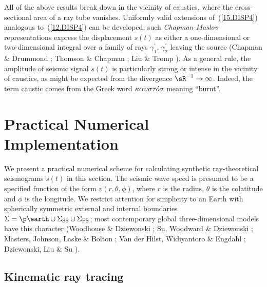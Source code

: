 All of the above results break down in the vicinity of caustics,
where the cross-sectional area of a ray tube vanishes.  Uniformly
valid extensions of~(\ref{15.DISP4}) analogous to~(\ref{12.DISP4})
can be developed; such {\em Chapman-Maslov\/}
%
representations express
the displacement $s(t)$ as either a one-dimensional or two-dimensional
integral over a family of rays $\gamma^{\prime}_1$, $\gamma^{\prime}_2$
leaving the source (Chapman \& Drummond \citeyear{chapman&drummond82};
Thomson \& Chapman \citeyear{thomson&chapman85};
Liu \& Tromp \citeyear{liu&tromp96}).   As a general rule,
the amplitude of seismic signal $s(t)$ is particularly strong or intense
in the vicinity of caustics, as might be expected from the
divergence $\sR^{-1}\rightarrow\infty$.  Indeed, the term caustic
comes from the Greek word $\kappa\alpha\upsilon\sigma
\tau\hspace{-0.2 mm}\acute{o}\sigma$ meaning ``burnt''.
%
%
%
%

\section{Practical Numerical Implementation}
\label{section:15.8}

We present a practical numerical scheme for calculating
synthetic ray-theoretical seismograms $s(t)$ in this section.
The seismic wave speed is presumed to be a specified function of
the form $v(r,\theta,\phi)$, where
$r$ is the radius, $\theta$ is the colatitude and $\phi$
is the longitude.  We restrict attention for simplicity to an
Earth with spherically symmetric external and internal boundaries
$\Sigma=\p\earth\cup\Sigma_{\rm SS}\cup\Sigma_{\rm FS}$; most
contemporary global three-dimensional models have this character
(Woodhouse \& Dziewonski \citeyear{woodhouse&dziewonski84};
Su, Woodward \& Dziewonski \citeyear{su&al94};
Masters, Johnson, Laske \& Bolton \citeyear{masters&al96};
Van der Hilst, Widiyantoro \& Engdahl \citeyear{vanderhilst&al96};
Dziewonski, Liu \& Su \citeyear{liu&dziewonski96}).

\subsection{Kinematic ray tracing}
%
%
\label{15.sec.jeroen1}

